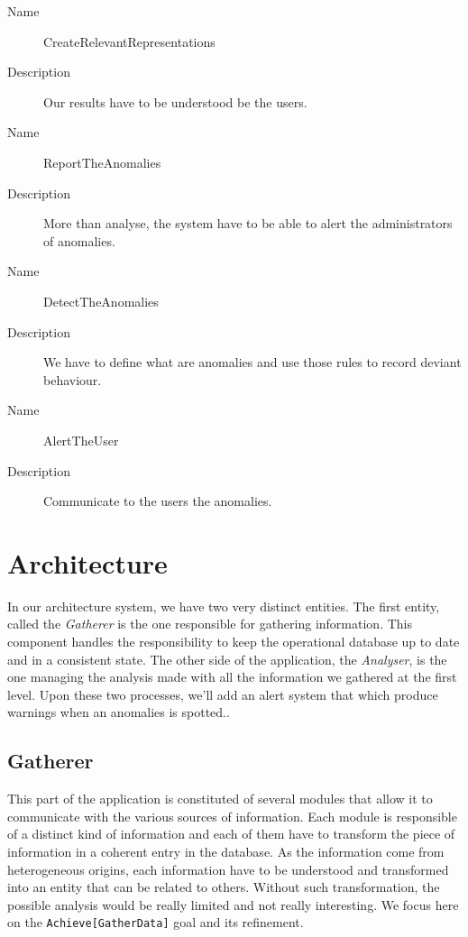 \begin{description}
  \item[Name] CreateRelevantRepresentations
  \item[Description] Our results have to be understood be the users.
\end{description}

\begin{description}
  \item[Name] ReportTheAnomalies
  \item[Description] More than analyse, the system have to be able to alert the administrators of anomalies.
\end{description}

\begin{description}
  \item[Name] DetectTheAnomalies
  \item[Description] We have to define what are anomalies and use those rules to record deviant behaviour.
\end{description}

\begin{description}
  \item[Name] AlertTheUser
  \item[Description] Communicate to the users the anomalies.
\end{description}

\section{Architecture}
In our architecture system, we have two very distinct entities. 
The first entity, called the \textit{Gatherer} is the one responsible for gathering information. This component handles the responsibility to keep the operational database up to date and in a consistent state. The other side of the application, the \textit{Analyser}, is the one managing the analysis made with all the information we gathered at the first level. Upon these two processes, we'll add an alert system that which produce warnings when an anomalies is spotted..

\subsection{Gatherer}
This part of the application is constituted of several modules that allow it to communicate with the various sources of information. Each module is responsible of a distinct kind of information and each of them have to transform the piece of information in a coherent entry in the database. As the information come from heterogeneous origins, each information have to be understood and transformed into an entity that can be related to others. Without such transformation, the possible analysis would be really limited and not really interesting. We focus here on the \texttt{Achieve[GatherData]} goal and its refinement.

